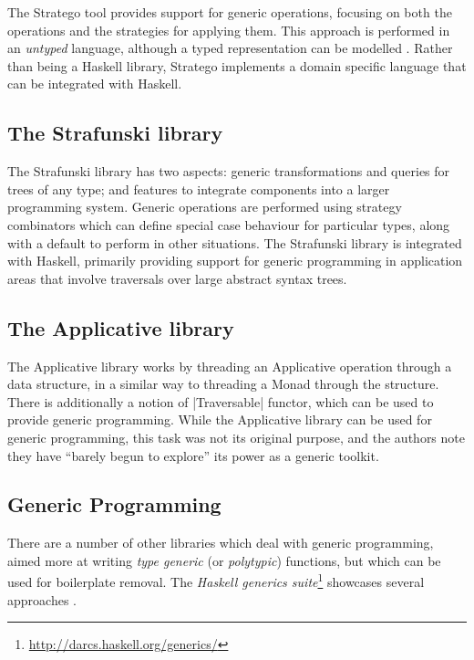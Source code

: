 The Stratego tool \citep{stratego} provides support for generic operations, focusing on both the operations and the strategies for applying them. This approach is performed in an \textit{untyped} language, although a typed representation can be modelled \cite{lammel:typed_generic_strategies}. Rather than being a Haskell library, Stratego implements a domain specific language that can be integrated with Haskell.

\subsection{The Strafunski library}

The Strafunski library \citep{strafunski, lammel:polymorphic_symphony} has two aspects: generic transformations and queries for trees of any type; and features to integrate components into a larger programming system. Generic operations are performed using strategy combinators which can define special case behaviour for particular types, along with a default to perform in other situations. The Strafunski library is integrated with Haskell, primarily providing support for generic programming in application areas that involve traversals over large abstract syntax trees.

\subsection{The Applicative library}

The Applicative library \citep{mcbride:applicative} works by threading an Applicative operation through a data structure, in a similar way to threading a Monad through the structure. There is additionally a notion of |Traversable| functor, which can be used to provide generic programming. While the Applicative library can be used for generic programming, this task was not its original purpose, and the authors note they have ``barely begun to explore'' its power as a generic toolkit.

\subsection{Generic Programming}

There are a number of other libraries which deal with generic programming, aimed more at writing \textit{type generic} (or \textit{polytypic}) functions, but which can be used for boilerplate removal. The \textit{Haskell generics suite}\footnote{\url{http://darcs.haskell.org/generics/}} showcases several approaches \citep{weirich:replib,hinze:generics_masses,hinze:generic_haskell}.

